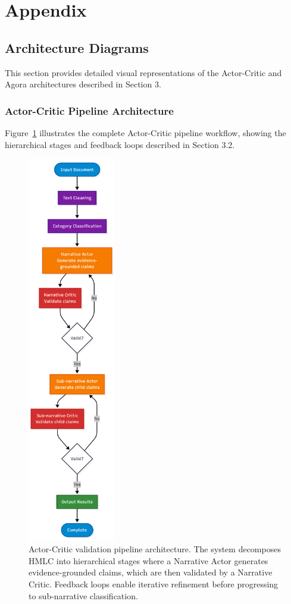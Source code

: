 \section{Appendix}

\subsection{Architecture Diagrams}
\label{appendix:architectures}

This section provides detailed visual representations of the Actor-Critic and Agora architectures described in Section 3.

\subsubsection{Actor-Critic Pipeline Architecture}

Figure~\ref{fig:actor_critic_pipeline} illustrates the complete Actor-Critic pipeline workflow, showing the hierarchical stages and feedback loops described in Section 3.2.

\begin{figure}[!ht]
\centering
\includegraphics[height=17cm]{assets/diagrams/actor-critique.png}
\caption{Actor-Critic validation pipeline architecture. The system decomposes HMLC into hierarchical stages where a Narrative Actor generates evidence-grounded claims, which are then validated by a Narrative Critic. Feedback loops enable iterative refinement before progressing to sub-narrative classification.}
\label{fig:actor_critic_pipeline}
\end{figure}

